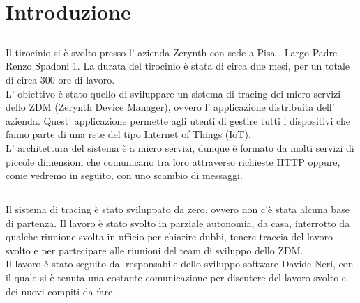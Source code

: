 \documentclass[a4paper,12pt,titlepage,italian,openany]{report}
\begin{document}
\begin{frontespizio}
\end{frontespizio}

\tableofcontents

\chapter{Introduzione}
\section{}
Il tirocinio si è  svolto presso l' azienda Zerynth con sede a Pisa , Largo Padre Renzo Spadoni 1.
La durata del tirocinio è stata di circa due mesi, per un totale di circa 300 ore di lavoro.
\\
L' obiettivo è stato quello di sviluppare un sistema di tracing dei micro servizi dello ZDM\cite{zdm:1} (Zerynth Device Manager), ovvero
l' applicazione distribuita dell' azienda. Quest' applicazione permette agli utenti di gestire tutti i dispositivi che fanno parte di una rete del tipo
Internet of Things (IoT).\\
L' architettura del sistema \`e a micro servizi, dunque è formato da molti servizi di piccole dimensioni che comunicano tra loro attraverso richieste HTTP oppure,
come vedremo in seguito, con uno scambio di messaggi. 

\section{}
Il sistema di tracing \`e stato sviluppato da zero, ovvero non c'è stata alcuna base di partenza. Il lavoro è stato svolto in parziale autonomia,
da casa, interrotto da qualche riunione svolta in ufficio per chiarire dubbi, tenere traccia del lavoro svolto e per partecipare alle riunioni del team di sviluppo dello ZDM\cite{zdm:1}.\\
Il lavoro è stato seguito dal responsabile dello sviluppo software Davide Neri, con il quale si è tenuta una costante comunicazione per discutere del lavoro svolto e dei nuovi compiti da fare.
\end{document}
